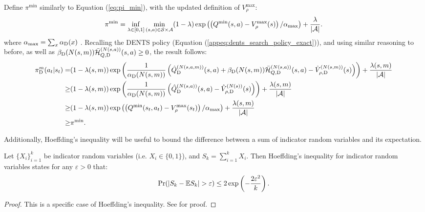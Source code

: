 \begin{proofoutline}
            Define $\pi^{\min}$ similarly to Equation (\ref{eq:pi_min}), with the updated definition of $V_\rho^{\max}$: 
            \begin{align}
                \pi^{\min} = \inf_{\lambda\in[0,1]} \min_{(s,a)\in\mathcal{S}\times\mathcal{A}} (1-\lambda) \exp\left(\left(Q^{\min}(s,a)-V_\rho^{\max}(s)\right)/\alpha_{\max}\right) + \frac{\lambda}{|\mathcal{A}|}. \label{eq:pi_min_dents}
            \end{align}
            where $\alpha_{\max}=\sum_x {\alpha_{{\textnormal{D}}}}(x)$ . Recalling the DENTS policy (Equation (\ref{appeq:dents_search_policy_exact})), and using similar reasoning to before, as well as ${\beta_{{\textnormal{D}}}}(N(s,m)){\bar{\mathcal{H}}^{(N(s,a))}_{Q,{\textnormal{D}}}}(s,a) \geq 0$, the result follows:
            \begin{align}
                {\pi^{m}_{{\textnormal{D}}}}(a_t|s_t) 
                    =& (1-\lambda(s,m))\exp\left(\frac{1}{{\alpha_{{\textnormal{D}}}}(N(s,m))}
                        \left({\hat{Q}^{(N(s,a,m))}_{{\textnormal{D}}}}(s,a) 
                        + {\beta_{{\textnormal{D}}}}(N(s,m)){\bar{\mathcal{H}}^{(N(s,a))}_{Q,{\textnormal{D}}}}(s,a) 
                        - {\hat{V}^{(N(s,m))}_{\rho,{\textnormal{D}}}}(s) \right)\right) 
                        + \frac{\lambda(s,m)}{|\mathcal{A}|} \\
                    \geq& (1-\lambda(s,m))\exp\left(\frac{1}{{\alpha_{{\textnormal{D}}}}(N(s,m))}
                        \left({\hat{Q}^{(N(s,a))}_{{\textnormal{D}}}}(s,a) - {\hat{V}^{(N(s))}_{\rho,{\textnormal{D}}}}(s) \right)\right) 
                        + \frac{\lambda(s,m)}{|\mathcal{A}|} \\
                    \geq& (1-\lambda(s,m))\exp\left(\left(Q^{\min}(s_t,a_t)-V_\rho^{\max}(s_t)\right)/\alpha_{\max}\right) 
                        + \frac{\lambda(s,m)}{|\mathcal{A}|} \\
                    \geq& \pi^{\min}.
            \end{align}
        \end{proofoutline}






    
    
        Additionally, Hoeffding's inequality will be useful to bound the difference between a sum of indicator random variables and its expectation. 
        \begin{theorem} \label{thrm:hoeffding}
            Let $\{X_i\}_{i=1}^k$ be indicator random variables (i.e. $X_i\in\{0,1\}$), and $S_k=\sum_{i=1}^k X_i$. Then Hoeffding's inequality for indicator random variables states for any $\varepsilon > 0$ that:
            \begin{align}
                \Pr(|S_k - \bb{E}S_k|>\varepsilon)\leq 2\exp\left(-\frac{2\varepsilon^2}{k}\right).
            \end{align}
        \end{theorem}
        \begin{proof}
            This is a specific case of Hoeffding's inequality. See  %
            for proof.
        \end{proof}
    









